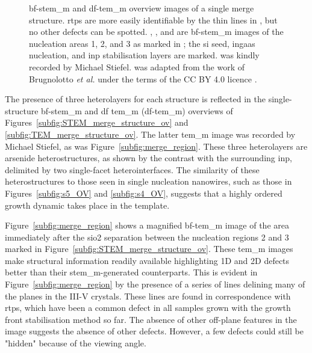 \begin{figure}
{
    }
    \caption[\acs{tem_m} and \acs{stem_m} images of the merge structures of sample 5.]{ \acs{bf}-\acs{stem_m} and  \acs{df}-\acs{tem_m} overview images of a single merge structure. \acs{rtp}s are more easily identifiable by the thin lines in , but no other defects can be spotted. , , and  are \acs{bf}-\acs{stem_m} images of the nucleation areas 1, 2, and 3 as marked in ; the \acs{si} seed, \acs{ingaas} nucleation, and \acs{inp} stabilisation layers are marked.  was kindly recorded by Michael Stiefel.  was adapted from the work of Brugnolotto \textit{et al.} \cite{Brugnolotto2023_2} under the terms of the CC BY 4.0 licence \cite{CCBY40}.}
    \label{fig:merge_ov_seeds}
\end{figure}

The presence of three heterolayers for each structure is reflected in the single-structure \acs{bf}-\acs{stem_m} and \acl{df} \acl{tem_m} (\acs{df}-\acs{tem_m}) overviews of Figures~\ref{subfig:STEM_merge_structure_ov} and \ref{subfig:TEM_merge_structure_ov}. The latter \acs{tem_m} image was recorded by Michael Stiefel, as was Figure~\ref{subfig:merge_region}. These three heterolayers are arsenide heterostructures, as shown by the contrast with the surrounding \acs{inp}, delimited by two single-facet  heterointerfaces. The similarity of these heterostructures to those seen in single nucleation nanowires, such as those in Figures~\ref{subfig:s5_OV} and \ref{subfig:s4_OV}, suggests that a highly ordered growth dynamic takes place in the template.

Figure~\ref{subfig:merge_region} shows a magnified \acs{bf}-\acs{tem_m} image of the area immediately after the \acs{sio2} separation between the nucleation regions 2 and 3 marked in Figure~\ref{subfig:STEM_merge_structure_ov}. These \acs{tem_m} images make structural information readily available highlighting 1D and 2D defects better than their \acs{stem_m}-generated counterparts. This is evident in Figure~\ref{subfig:merge_region} by the presence of a series of lines delining many of the  planes in the III-V crystals. These lines are found in correspondence with \acs{rtp}s, which have been a common defect in all samples grown with the  growth front stabilisation method so far. The absence of other off-plane features in the image suggests the absence of other defects. However, a few defects could still be "hidden" because of the viewing angle.

